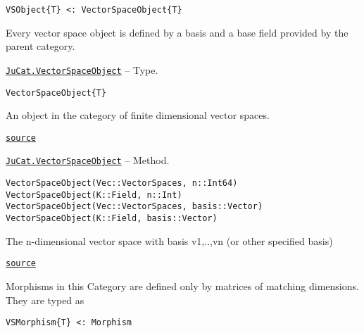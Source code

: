 \documentclass{memoir}
\begin{document}
\begin{lstlisting}
VSObject{T} <: VectorSpaceObject{T}
\end{lstlisting}



Every vector space object is defined by a basis and a base field provided by the parent category.


\hypertarget{9222576805308484798}{} 
\hyperlink{9222576805308484798}{\texttt{JuCat.VectorSpaceObject}}  -- {Type.}

\begin{adjustwidth}{2em}{0pt}


\begin{verbatim}
VectorSpaceObject{T}
\end{verbatim}

An object in the category of finite dimensional vector spaces.



\href{https://github.com/FabianMaeurer/JuCat.jl/blob/367390e2d003deec2ababa73caeab405e934bb35/src/structures/abstracts.jl#L21-L25}{\texttt{source}}


\end{adjustwidth}
\hypertarget{3146134203222481508}{} 
\hyperlink{3146134203222481508}{\texttt{JuCat.VectorSpaceObject}}  -- {Method.}

\begin{adjustwidth}{2em}{0pt}


\begin{verbatim}
VectorSpaceObject(Vec::VectorSpaces, n::Int64)
VectorSpaceObject(K::Field, n::Int)
VectorSpaceObject(Vec::VectorSpaces, basis::Vector)
VectorSpaceObject(K::Field, basis::Vector)
\end{verbatim}

The n-dimensional vector space with basis v1,..,vn (or other specified basis)



\href{https://github.com/FabianMaeurer/JuCat.jl/blob/367390e2d003deec2ababa73caeab405e934bb35/src/structures/VectorSpaces/VectorSpaces.jl#L39-L46}{\texttt{source}}


\end{adjustwidth}

Morphisms in this Category are defined only by matrices of matching dimensions. They are typed as




\begin{verbatim}
VSMorphism{T} <: Morphism
\end{verbatim}
\end{document}
